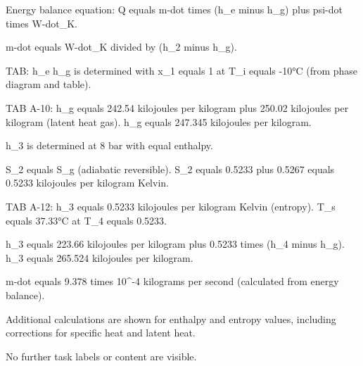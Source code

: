 Energy balance equation:  
Q equals m-dot times (h_e minus h_g) plus psi-dot times W-dot_K.  

m-dot equals W-dot_K divided by (h_2 minus h_g).  

TAB: h_e  
h_g is determined with x_1 equals 1 at T_i equals -10°C (from phase diagram and table).  

TAB A-10: h_g equals 242.54 kilojoules per kilogram plus 250.02 kilojoules per kilogram (latent heat gas).  
h_g equals 247.345 kilojoules per kilogram.  

h_3 is determined at 8 bar with equal enthalpy.  

S_2 equals S_g (adiabatic reversible).  
S_2 equals 0.5233 plus 0.5267 equals 0.5233 kilojoules per kilogram Kelvin.  

TAB A-12:  
h_3 equals 0.5233 kilojoules per kilogram Kelvin (entropy).  
T_s equals 37.33°C at T_4 equals 0.5233.  

h_3 equals 223.66 kilojoules per kilogram plus 0.5233 times (h_4 minus h_g).  
h_3 equals 265.524 kilojoules per kilogram.  

m-dot equals 9.378 times 10^-4 kilograms per second (calculated from energy balance).  

Additional calculations are shown for enthalpy and entropy values, including corrections for specific heat and latent heat.  

No further task labels or content are visible.